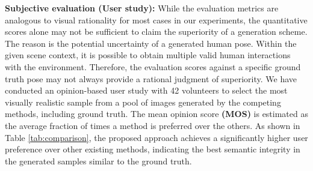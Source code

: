 \noindent
\textbf{Subjective evaluation (User study):}
While the evaluation metrics are analogous to visual rationality for most cases in our experiments, the quantitative scores alone may not be sufficient to claim the superiority of a generation scheme. The reason is the potential uncertainty of a generated human pose. Within the given scene context, it is possible to obtain multiple valid human interactions with the environment. Therefore, the evaluation scores against a specific ground truth pose may not always provide a rational judgment of superiority. We have conducted an opinion-based user study with 42 volunteers to select the most visually realistic sample from a pool of images generated by the competing methods, including ground truth. The mean opinion score \textbf{(MOS)} is estimated as the average fraction of times a method is preferred over the others. As shown in Table \ref{tab:comparison}, the proposed approach achieves a significantly higher user preference over other existing methods, indicating the best semantic integrity in the generated samples similar to the ground truth.

